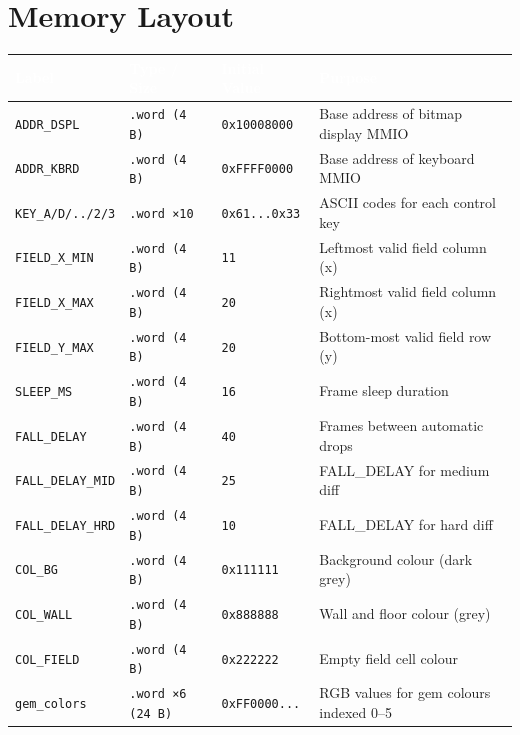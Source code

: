 \documentclass{article}
\begin{document}
\section{Memory Layout}
\begin{table}[h]
\centering
\begin{tabular}{|l|l|l|p{6cm}|}
\hline
\rowcolor[HTML]{2E4057}
\textcolor{white}{\textbf{Label}} &
\textcolor{white}{\textbf{Type / Size}} &
\textcolor{white}{\textbf{Initial Value}} &
\textcolor{white}{\textbf{Purpose}} \\
\hline
\texttt{ADDR\_DSPL}    & \texttt{.word (4 B)}    & \texttt{0x10008000}  & Base address of bitmap display MMIO \\
\texttt{ADDR\_KBRD}    & \texttt{.word (4 B)}    & \texttt{0xFFFF0000}  & Base address of keyboard MMIO \\
\texttt{KEY\_A/D/../2/3}& \texttt{.word ×10}       & \texttt{0x61...0x33} & ASCII codes for each control key \\
\texttt{FIELD\_X\_MIN} & \texttt{.word (4 B)}    & \texttt{11}          & Leftmost valid field column (x) \\
\texttt{FIELD\_X\_MAX} & \texttt{.word (4 B)}    & \texttt{20}          & Rightmost valid field column (x) \\
\texttt{FIELD\_Y\_MAX} & \texttt{.word (4 B)}    & \texttt{20}          & Bottom-most valid field row (y) \\
\texttt{SLEEP\_MS}     & \texttt{.word (4 B)}    & \texttt{16}          & Frame sleep duration\\
\texttt{FALL\_DELAY}   & \texttt{.word (4 B)}    & \texttt{40}          & Frames between automatic drops\\
\texttt{FALL\_DELAY\_MID}   & \texttt{.word (4 B)}    & \texttt{25}          & FALL\_DELAY for medium diff\\
\texttt{FALL\_DELAY\_HRD}   & \texttt{.word (4 B)}    & \texttt{10}          & FALL\_DELAY for hard diff\\
\texttt{COL\_BG}       & \texttt{.word (4 B)}    & \texttt{0x111111}    & Background colour (dark grey) \\
\texttt{COL\_WALL}     & \texttt{.word (4 B)}    & \texttt{0x888888}    & Wall and floor colour (grey) \\
\texttt{COL\_FIELD}    & \texttt{.word (4 B)}    & \texttt{0x222222}    & Empty field cell colour \\
\texttt{gem\_colors}   & \texttt{.word ×6 (24 B)}& \texttt{0xFF0000...} & RGB values for gem colours indexed 0--5 \\

\end{tabular}
\end{table}
\end{document}

